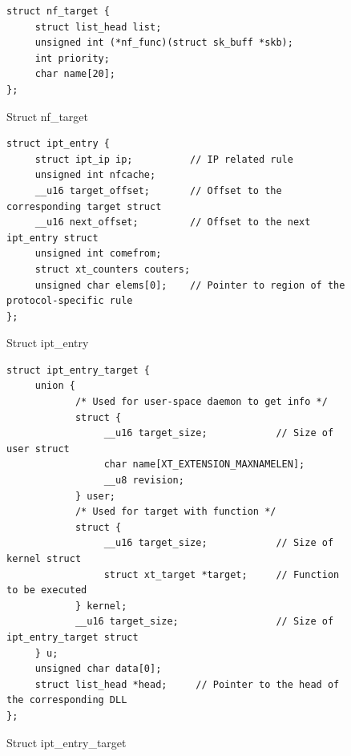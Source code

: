 \begin{figure}
	\begin{center}
		\begin{screen}
			\begin{verbatim}
struct nf_target {
     struct list_head list;
     unsigned int (*nf_func)(struct sk_buff *skb);
     int priority;
     char name[20];
};
			\end{verbatim}	
		\end{screen}
	\end{center}	
	\caption{Struct nf\_target}
	\label{fig: imp1}
\end{figure}

\begin{figure}
	\begin{center}
		\begin{screen}
			\begin{verbatim}
struct ipt_entry {
     struct ipt_ip ip;          // IP related rule
     unsigned int nfcache;
     __u16 target_offset;       // Offset to the corresponding target struct
     __u16 next_offset;         // Offset to the next ipt_entry struct 
     unsigned int comefrom;
     struct xt_counters couters;
     unsigned char elems[0];    // Pointer to region of the protocol-specific rule 
};	
			\end{verbatim}
		\end{screen}
	\end{center}
	\caption{Struct ipt\_entry}
	\label{fig: imp2}
\end{figure}

\begin{figure}
	\begin{center}
		\begin{screen}
			\begin{verbatim}
struct ipt_entry_target {
     union {
            /* Used for user-space daemon to get info */
            struct {
                 __u16 target_size;            // Size of user struct 
                 char name[XT_EXTENSION_MAXNAMELEN];
                 __u8 revision;
            } user;
            /* Used for target with function */
            struct {
                 __u16 target_size;            // Size of kernel struct 
                 struct xt_target *target;     // Function to be executed 
            } kernel;
            __u16 target_size;                 // Size of ipt_entry_target struct 
     } u;
     unsigned char data[0];
     struct list_head *head;     // Pointer to the head of the corresponding DLL
};
			\end{verbatim}
		\end{screen}
	\end{center}
	\caption{Struct ipt\_entry\_target}
	\label{fig: imp3}
\end{figure}
			
